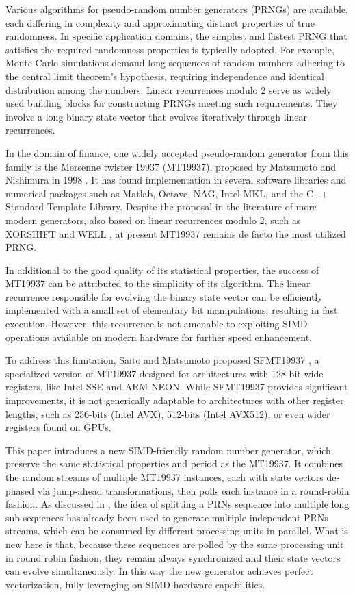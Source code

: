 \documentclass[preprint,1p,times]{elsarticle}
\begin{document}
	Various algorithms for pseudo-random number generators (PRNGs) are available, each differing in complexity and approximating distinct properties of true randomness. In specific application domains, the simplest and fastest PRNG that satisfies the required randomness properties is typically adopted. For example, Monte Carlo simulations demand long sequences of random numbers adhering to the central limit theorem's hypothesis, requiring independence and identical distribution among the numbers. Linear recurrences modulo 2 serve as widely used building blocks for constructing PRNGs meeting such requirements. They involve a long binary state vector that evolves iteratively through linear recurrences.
	
	In the domain of finance, one widely accepted pseudo-random generator from this family is the Mersenne twister 19937 (MT19937), proposed by Matsumoto and Nishimura in 1998 \cite{mt19937}. It has found implementation in several software libraries and numerical packages such as Matlab, Octave, NAG, Intel MKL, and the C++ Standard Template Library. Despite the proposal in the literature of more modern generators, also based on linear recurrences modulo 2, such as XORSHIFT \cite{xorshift} and WELL \cite{well}, at present MT19937 remains de facto the most utilized PRNG.
	
	In additional to the good quality of its statistical properties, the success of MT19937 can be attributed to the simplicity of its algorithm. The linear recurrence responsible for evolving the binary state vector can be efficiently implemented with a small set of elementary bit manipulations, resulting in fast execution. However, this recurrence is not amenable to exploiting SIMD operations available on modern hardware for further speed enhancement.
	
	To address this limitation, Saito and Matsumoto proposed SFMT19937 \cite{sfmt19937}, a specialized version of MT19937 designed for architectures with 128-bit wide registers, like Intel SSE and ARM NEON. While SFMT19937 provides significant improvements, it is not generically adaptable to architectures with other register lengths, such as 256-bits (Intel AVX), 512-bits (Intel AVX512), or even wider registers found on GPUs.
	
	This paper introduces a new SIMD-friendly random number generator, which preserve the same statistical properties and period as the MT19937. It combines the random streams of multiple MT19937 instances, each with state vectors de-phased via jump-ahead transformations, then polls each instance in a round-robin fashion. As discussed in \cite{multistream}, the idea of splitting a PRNs sequence into multiple long sub-sequences has already been used to generate multiple independent PRNs streams, which can be consumed by different processing units in parallel. What is new here is that, because these sequences are polled by the same processing unit in round robin fashion, they remain always synchronized and their state vectors can evolve simultaneously. In this way the new generator achieves perfect vectorization, fully leveraging on SIMD hardware capabilities.
	
\end{document}
